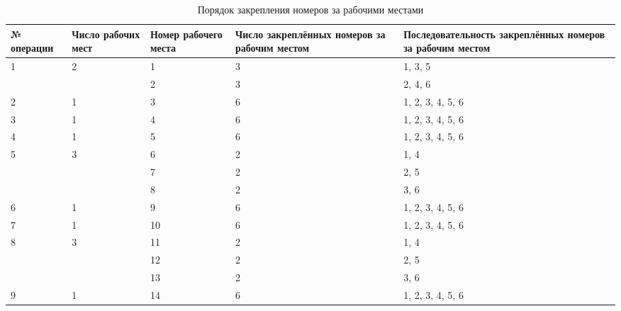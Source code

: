 \begin{table} [h!]
  \caption{
    Порядок закрепления номеров за рабочими местами
  }\label{tbl:numbers_fixation}
  {\small
    \begin{tabular}{| m{2.0cm} | m{2.0cm} | m{2.0cm} | m{4.1cm} | m{4.1cm} |}
      \hline
      № операции &
      Число рабочих мест &
      Номер рабочего места &
      Число закреплённых номеров за \newline рабочим местом &
      Последовательность закреплённых номеров за \newline рабочим местом \\
      \hline

      \multirow{2}{*}{1} & \multirow{2}{*}{2} & 1 & 3 & 1, 3, 5 \\
                                            \cline{3-5}
                                            & & 2 & 3 & 2, 4, 6 \\
      \hline

      2 & 1 & 3 & 6 & 1, 2, 3, 4, 5, 6 \\ \hline
      3 & 1 & 4 & 6 & 1, 2, 3, 4, 5, 6 \\ \hline
      4 & 1 & 5 & 6 & 1, 2, 3, 4, 5, 6 \\ \hline

      \multirow{3}{*}{5} & \multirow{3}{*}{3} & 6 & 2 & 1, 4 \\
                                            \cline{3-5}
                                            & & 7 & 2 & 2, 5 \\
                                            \cline{3-5}
                                            & & 8 & 2 & 3, 6 \\
      \hline

      6 & 1 & 9  & 6 & 1, 2, 3, 4, 5, 6 \\ \hline
      7 & 1 & 10 & 6 & 1, 2, 3, 4, 5, 6 \\ \hline

      \multirow{3}{*}{8} & \multirow{3}{*}{3} & 11 & 2 & 1, 4 \\
                                            \cline{3-5}
                                            & & 12 & 2 & 2, 5 \\
                                            \cline{3-5}
                                            & & 13 & 2 & 3, 6 \\
      \hline

      9 & 1 & 14 & 6 & 1, 2, 3, 4, 5, 6 \\ \hline

    \end{tabular}
  }
\end{table}


